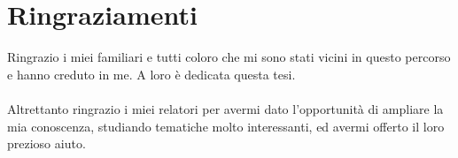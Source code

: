 \chapter*{Ringraziamenti}
Ringrazio i miei familiari e tutti coloro che mi sono stati vicini in questo percorso e hanno creduto in me. A loro è dedicata questa tesi.
\\\\
Altrettanto ringrazio i miei relatori per avermi dato l'opportunità di ampliare la mia conoscenza, studiando tematiche molto interessanti, ed avermi offerto il loro prezioso aiuto.

